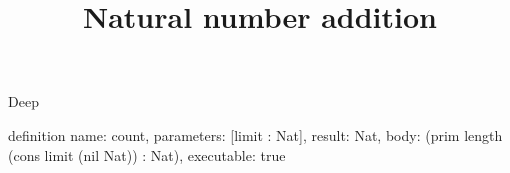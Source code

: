 \begin{lexlean}{Deep}
\title{Natural number addition}
\begin{semanticmodule}
definition{
  name: count,
  parameters: [limit : Nat],
  result: Nat,
  body: (prim length (cons limit (nil Nat)) : Nat),
  executable: true
}
\end{semanticmodule}
\end{lexlean}
